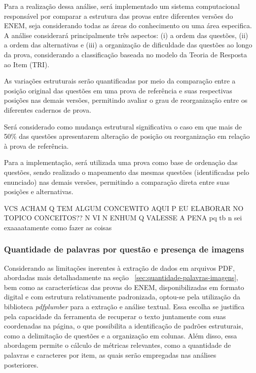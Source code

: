 \documentclass[a4paper,10pt, twocolumn]{article}
\begin{document}
Para a realização dessa análise, será implementado um sistema computacional responsável por comparar a estrutura das provas entre diferentes versões do ENEM, seja considerando todas as áreas do conhecimento ou uma área especifica. A análise considerará principalmente três aspectos: (i) a ordem das questões, (ii) a ordem das alternativas e (iii) a organização de dificuldade das questões ao longo da prova, considerando a classificação baseada no modelo da Teoria de Resposta ao Item (TRI).

As variações estruturais serão quantificadas por meio da comparação entre a posição original das questões em uma prova de referência e suas respectivas posições nas demais versões, permitindo avaliar o grau de reorganização entre os diferentes cadernos de prova.

Será considerado como mudança estrutural significativa o caso em que mais de 50\% das questões apresentarem alteração de posição ou reorganização em relação à prova de referência.

Para a implementação, será utilizada uma prova como base de ordenação das questões, sendo realizado o mapeamento das mesmas questões (identificadas pelo enunciado) nas demais versões, permitindo a comparação direta entre suas posições e alternativas.

VCS ACHAM Q TEM ALGUM CONCEWITO AQUI P EU ELABORAR NO TOPICO CONCEITOS?? N VI N ENHUM Q VALESSE A PENA pq tb n sei exaaaatamente como fazer as coisas

\subsubsection{Quantidade de palavras por questão e presença de imagens} 

Considerando as limitações inerentes à extração de dados em arquivos PDF, abordadas mais detalhadamente na seção ~\ref{sec:quantidade-palavras-imagens}, bem como as características das provas do ENEM, disponibilizadas em formato digital e com estrutura relativamente padronizada, optou-se pela utilização da biblioteca \textit{pdfplumber} para a extração e análise textual. Essa escolha se justifica pela capacidade da ferramenta de recuperar o texto juntamente com suas coordenadas na página, o que possibilita a identificação de padrões estruturais, como a delimitação de questões e a organização em colunas. Além disso, essa abordagem permite o cálculo de métricas relevantes, como a quantidade de palavras e caracteres por item, as quais serão empregadas nas análises posteriores.
\end{document}
